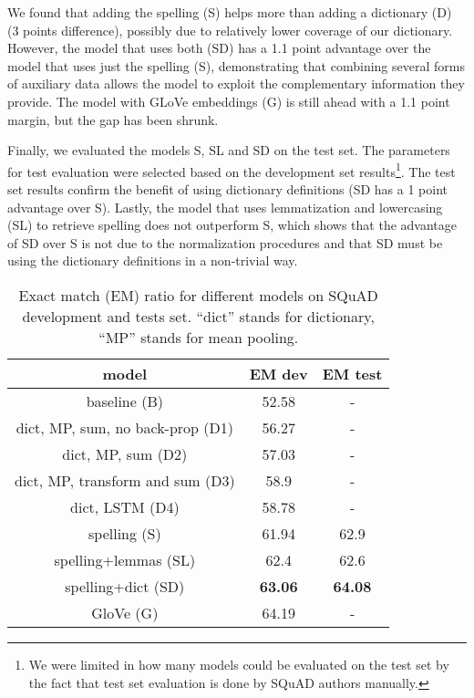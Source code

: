 We found that adding the spelling (S) helps more than adding a dictionary (D) (3 points difference), possibly due to relatively lower coverage 
of our dictionary. However,  the model that uses both (SD) has a 1.1 point
advantage over the model that uses just the spelling (S), demonstrating that combining several forms of auxiliary data allows the model to exploit the complementary information they provide. The model with GLoVe embeddings (G) is still ahead with a 1.1 point margin, but the gap has been shrunk. 

Finally, we evaluated the models S, SL and SD on the test set. The parameters for test evaluation were selected based on the development set results\footnote{We were limited in how many models could be evaluated on the test set by the fact that test set evaluation is done by SQuAD authors manually.}. The test set results confirm the benefit of using dictionary definitions (SD has a 1 point advantage over S).  Lastly, the model that uses lemmatization and lowercasing (SL) to retrieve spelling does not outperform S, which shows that the advantage of SD over S is not due to the normalization procedures and that SD must be using the dictionary definitions in a non-trivial way.

\begin{table}
   \caption{\label{table:squad}Exact match (EM) ratio for different models on SQuAD development and tests set. ``dict'' stands for dictionary, ``MP'' stands for mean pooling.} 
  \centering
  \begin{tabular}{ccc}
  	\toprule
    model & EM dev & EM test \\
    \midrule
    baseline (B) & 52.58 & - \\
    \midrule
    dict, MP, sum, no back-prop (D1) & 56.27 & - \\
    dict, MP, sum (D2) & 57.03 & - \\    
    dict, MP, transform and sum (D3) & 58.9 & - \\
    dict, LSTM (D4) & 58.78 & -  \\
    spelling (S) & 61.94 & 62.9 \\ 
    spelling+lemmas (SL) & 62.4 & 62.6 \\
    spelling+dict (SD) & \textbf{63.06} & \textbf{64.08} \\ 
    \hline
    GloVe (G) & 64.19 & -\\ 
    \bottomrule
  \end{tabular}
\end{table}

